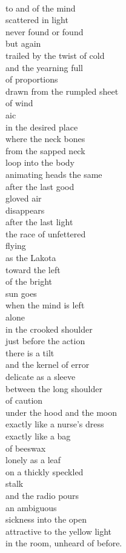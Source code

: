 \documentclass[smalldemyvopaper,11pt,twoside,onecolumn,openright,extrafontsizes]{memoir}
\begin{document}
\\to and of the mind
\\scattered in light
\\never found or found
\\but again
\\trailed by the twist of cold
\\and the yearning full
\\of proportions
\\drawn from the rumpled sheet
\\of wind
\\aic
\\in the desired place
\\where the neck bones
\\from the sapped neck
\\loop into the body
\\animating heads the same
\\after the last good
\\gloved air
\\disappears
\\after the last light
\\the race of unfettered
\\flying
\\as the Lakota
\\toward the left
\\of the bright
\\sun goes
\\when the mind is left
\\alone
\\in the crooked shoulder
\\just before the action
\\there is a tilt
\\and the kernel of error
\\delicate as a sleeve
\\between the long shoulder
\\of caution
\\under the hood and the moon
\\exactly like a nurse's dress
\\exactly like a bag
\\of beeswax
\\lonely as a leaf
\\on a thickly speckled
\\stalk
\\and the radio pours
\\an ambiguous
\\sickness into the open
\\attractive to the yellow light
\\in the room, unheard of before.
\end{document}
